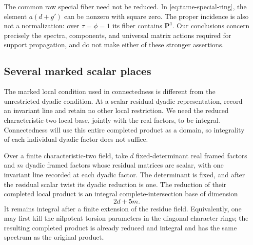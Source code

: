 \begin{remark}
The common raw special fiber need not be reduced.  In
\eqref{eq:tame-special-ring}, the element $a(d+g')$ can be nonzero
with square zero.  The proper incidence is also not a normalization:
over $\tau=\phi=1$ its fiber contains $\mathbf P^1$.  Our conclusions
concern precisely the spectra, components, and universal matrix
actions required for support propagation, and do not make either
of these stronger assertions.
\end{remark}

\subsection{Several marked scalar places}

The marked local condition used in connectedness is different from
the unrestricted dyadic condition.  At a scalar residual dyadic
representation, record an invariant line and retain no other local
restriction.  We need the reduced characteristic-two local base,
jointly with the real factors, to be integral. Connectedness will use
this entire completed product as a domain, so integrality of each
individual dyadic factor does not suffice.

\begin{lemma}\label{lem:marked-local-base}
Over a finite characteristic-two field, take $d$ fixed-determinant
real framed factors and $m$ dyadic framed factors whose residual
matrices are scalar, with one invariant line recorded at each
dyadic factor.  The determinant is fixed, and after the residual
scalar twist its dyadic reduction is one.  The reduction of their
completed local product is an integral complete-intersection base
of dimension
\[
2d+5m.
\]
It remains integral after a finite extension of the residue field.
Equivalently, one may first kill the nilpotent torsion parameters in
the diagonal character rings; the resulting completed product is
already reduced and integral and has the same spectrum as the
original product.
\end{lemma}

